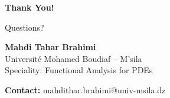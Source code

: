 \documentclass[11pt]{beamer}
\begin{document}
	\begin{frame}
		\begin{center}
			\Huge\textbf{Thank You!}
			
			\vspace{1cm}
			
			\Large Questions?
			
			\vspace{1cm}
			
			\normalsize
			\textbf{Mahdi Tahar Brahimi}\\
			\small Université Mohamed Boudiaf -- M'sila\\
			\small Speciality: Functional Analysis for PDEs
			
			\vspace{0.5cm}
			
			\scriptsize
			\textbf{Contact:} mahdithar.brahimi@univ-msila.dz
		\end{center}
	\end{frame}
	
\end{document}
